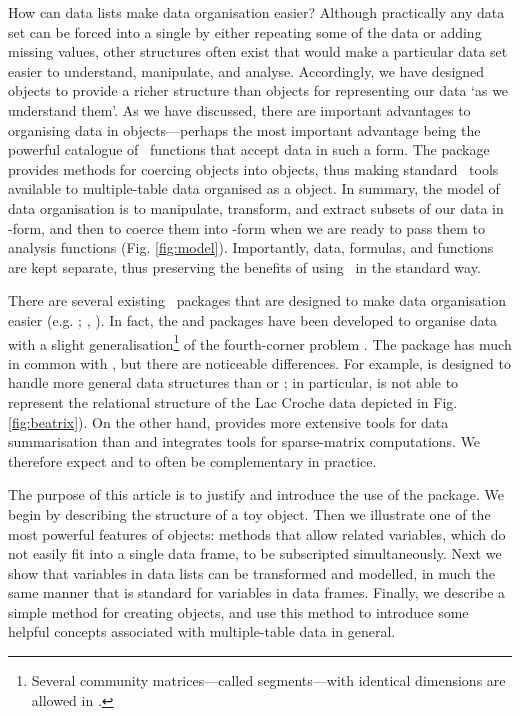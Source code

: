\documentclass[a4paper]{report}
\numberwithin{exercise}{section}
\begin{document}
\begin{article}
How can data lists make data organisation easier?  Although practically any data set can be forced into a single  by either repeating some of the data or adding missing values, other structures often exist that would make a particular data set easier to understand, manipulate, and analyse.  Accordingly, we have designed  objects to provide a richer structure than  objects for representing our data `as we understand them'.  As we have discussed, there are important advantages to organising data in  objects---perhaps the most important advantage being the powerful catalogue of \R\ functions that accept data in such a form.  The  package provides methods for coercing  objects into  objects, thus making standard \R\ tools available to multiple-table data organised as a  object.  In summary, the  model of data organisation is to manipulate, transform, and extract subsets of our data in -form, and then to coerce them into -form when we are ready to pass them to analysis functions (Fig. \ref{fig:model}).  Importantly, data, formulas, and functions are kept separate, thus preserving the benefits of using \R\ in the standard way.

There are several existing \R\ packages that are designed to make data organisation easier (e.g. ; \citeauthor{Wickham2007}, \citeyear{Wickham2007}).  In fact, the  and  packages have been developed to organise data with a slight generalisation\footnote{Several community matrices---called segments---with identical dimensions are allowed in .} of the fourth-corner problem \citep{Solymos2009}.  The  package has much in common with , but there are noticeable differences.  For example,  is designed to handle more general data structures than  or ; in particular,  is not able to represent the relational structure of the Lac Croche data depicted in Fig. \ref{fig:beatrix}).  On the other hand,  provides more extensive tools for data summarisation than  and  integrates tools for sparse-matrix computations.  We therefore expect  and  to often be complementary in practice.

The purpose of this article is to justify and introduce the use of the  package.  We begin by describing the structure of a toy  object.  Then we illustrate one of the most powerful features of  objects:  methods that allow related variables, which do not easily fit into a single data frame, to be subscripted simultaneously.  Next we show that variables in data lists can be transformed and modelled, in much the same manner that is standard for variables in data frames.  Finally, we describe a simple method for creating  objects, and use this method to introduce some helpful concepts associated with multiple-table data in general.


\end{article}
\end{document}
